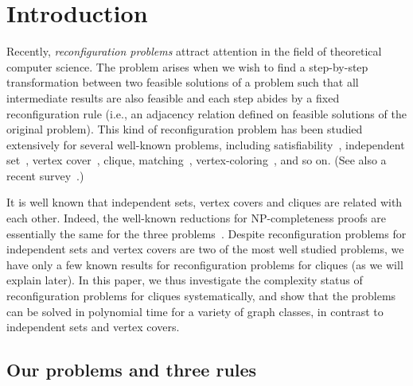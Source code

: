 \documentclass{llncs}
\newcounter{two}
\newcounter{three}
\begin{document}
\section{Introduction}
Recently, {\em reconfiguration problems} attract attention 
in the field of theoretical computer science. 
The problem arises when we wish to find a step-by-step transformation between 
two feasible solutions of a problem such that 
all intermediate results are also feasible and 
each step abides by a fixed reconfiguration rule 
(i.e., an adjacency relation defined on feasible solutions of the original problem).
This kind of reconfiguration problem has been studied extensively 
for several well-known problems, including 
{\sc satisfiability}~\cite{Kolaitis}, 
{\sc independent set}~\cite{Bon14,HearnDemaine2005,IDHPSUU,KaminskiMM12,Wro14}, 
{\sc vertex cover}~\cite{INZ14,MNR14},
{\sc clique}, {\sc matching}~\cite{IDHPSUU}, 
{\sc vertex-coloring}~\cite{BC09},
and so on.
(See also a recent survey~\cite{van13}.)

	It is well known that independent sets, vertex covers and cliques are related with each other. 
	Indeed, the well-known reductions for NP-completeness proofs are essentially the same for the three problems~\cite{GJ79}.
	Despite reconfiguration problems for independent sets and vertex covers are two of the most well studied problems, we have only a few known results for reconfiguration problems for cliques (as we will explain later). 
	In this paper, we thus investigate the complexity status of reconfiguration problems for cliques systematically, and show that the problems can be solved in polynomial time for a variety of graph classes, in contrast to independent sets and vertex covers.  

\subsection{Our problems and three rules}
\end{document}
